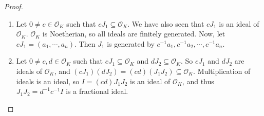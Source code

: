 \documentclass{article}
\newcommand{\air}{\mathcal{O}_K}
\begin{document}
\begin{proof}
\begin{enumerate}
\item Let $0\neq c\in\air$ such that $cJ_1\subseteq \air$. We have also seen that $cJ_1$ is an ideal of $\air$. $\air$ is Noetherian, so all ideals are finitely generated. Now, let $cJ_1 = (a_1,\cdots, a_n)$. Then $J_1$ is generated by $c^{-1}a_1, c^{-1}a_2,\cdots, c^{-1}a_n$.
\item Let $0\neq c,d\in\air$ such that $cJ_1\subseteq \air$ and $dJ_2\subseteq \air$. So $cJ_1$ and $dJ_2$ are ideals of $\air$, and $(cJ_1)(dJ_2)=(cd)(J_1J_2)\subseteq \air$. Multiplication of ideals is an ideal, so $I=(cd)J_1J_2$ is an ideal of $\air$, and thus $J_1J_2=d^{-1}c^{-1}I$ is a fractional ideal.
\end{enumerate}
\end{proof}
\end{document}
